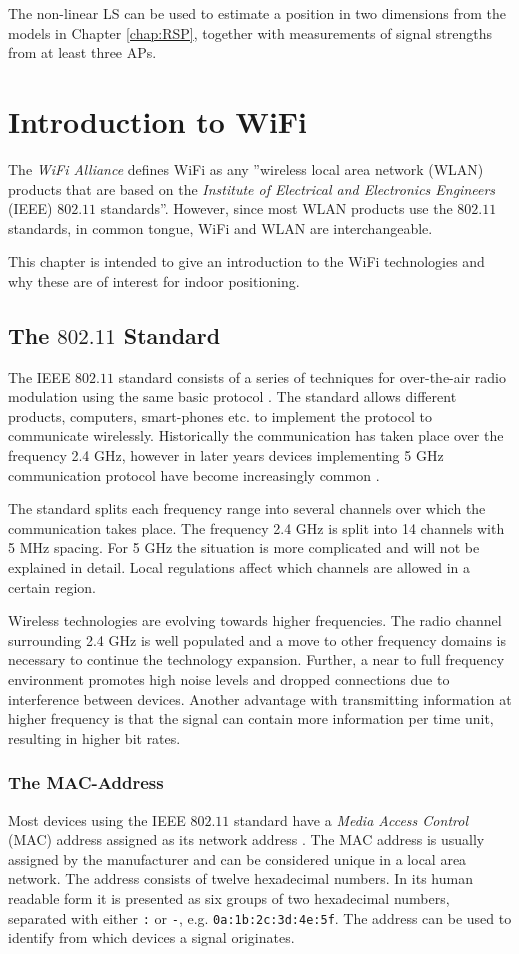 \documentclass{LTHthesis}
\begin{document}
The non-linear LS can be used to estimate a position in two dimensions from the models in Chapter \ref{chap:RSP}, together with measurements of signal
 strengths from at least three APs. 
%
\chapter{Introduction to WiFi} %
\label{chap:wifi}
The \emph{WiFi Alliance} defines WiFi as any ''wireless local area network (WLAN) products that are based on the \emph{Institute of Electrical and Electronics Engineers} (IEEE) $802.11$ standards''. However, since most WLAN products use the $802.11$ standards, in common tongue, WiFi and WLAN are interchangeable.    

This chapter is intended to give an introduction to the WiFi technologies and why these are of interest for indoor positioning.
%
\section{The $802.11$ Standard}
%
The IEEE $802.11$ standard consists of a series of techniques for over-the-air radio modulation using the same basic protocol \cite{IEEE:802.11}. The standard allows different products, computers, smart-phones etc. to implement the protocol to communicate wirelessly. Historically the communication has taken place over the frequency 2.4 GHz, however in later years devices implementing 5 GHz communication protocol have become increasingly common \cite{walrand10}.

The standard splits each frequency range into several channels over which the communication takes place. The frequency 2.4 GHz is split into 14 channels with 5 MHz spacing. For 5 GHz the situation is more complicated and will not be explained in detail. Local regulations affect which channels are allowed in a certain region.   

Wireless technologies are evolving towards higher frequencies. The radio channel  surrounding 2.4 GHz is well populated and a move to other frequency domains is necessary to continue the technology expansion. Further, a near to full frequency environment promotes high noise levels and dropped connections due to interference between devices. Another advantage with transmitting information at higher frequency is that the signal can contain more information per time unit, resulting in higher bit rates.    
%
\subsection{The MAC-Address}
%
Most devices using the IEEE $802.11$ standard have a \emph{Media Access Control} (MAC) address assigned as its network address \cite{IEEE:802.11}. The MAC address is usually assigned by the manufacturer and can be considered unique in a local area network. The address consists of twelve hexadecimal numbers. In its human readable form it is presented as six groups of two hexadecimal numbers, separated with either \verb|:| or \verb|-|, e.g. \verb|0a:1b:2c:3d:4e:5f|. The address can be used to identify from which devices a signal originates.
%
\end{document}

